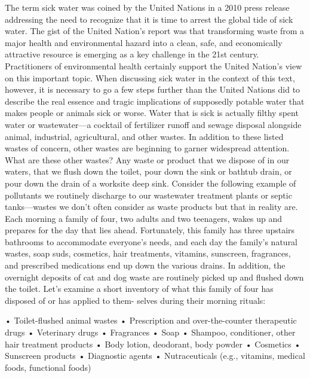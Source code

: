 \documentclass{article}
\begin{document}
The term sick water was coined by the United Nations in a 2010 press
release addressing the need to recognize that it is time to arrest the
global tide of sick water. The gist of the United Nation's report was
that transforming waste from a major health and environmental hazard
into a clean, safe, and economically attractive resource is emerging as
a key challenge in the 21st century. Practitioners of environmental
health certainly support the United Nation's view on this important
topic. When discussing sick water in the context of this text, however,
it is necessary to go a few steps further than the United Nations did to
describe the real essence and tragic implications of supposedly potable
water that makes people or animals sick or worse. Water that is sick is
actually filthy spent water or wastewater---a cocktail of fertilizer
runoff and sewage disposal alongside animal, industrial, agricultural,
and other wastes. In addition to these listed wastes of concern, other
wastes are beginning to garner widespread attention. What are these
other wastes? Any waste or product that we dispose of in our waters,
that we flush down the toilet, pour down the sink or bathtub drain, or
pour down the drain of a worksite deep sink. Consider the following
example of pollutants we routinely discharge to our wastewater treatment
plants or septic tanks---wastes we don't often consider as waste
products but that in reality are. Each morning a family of four, two
adults and two teenagers, wakes up and prepares for the day that lies
ahead. Fortunately, this family has three upstairs bathrooms to
accommodate everyone's needs, and each day the family's natural wastes,
soap suds, cosmetics, hair treatments, vitamins, sunscreen, fragrances,
and prescribed medications end up down the various drains. In addition,
the overnight deposits of cat and dog waste are routinely picked up and
flushed down the toilet. Let's examine a short inventory of what this
family of four has disposed of or has applied to them- selves during
their morning rituals:

• Toilet-flushed animal wastes • Prescription and over-the-counter
therapeutic drugs • Veterinary drugs • Fragrances • Soap • Shampoo,
conditioner, other hair treatment products • Body lotion, deodorant,
body powder • Cosmetics • Sunscreen products • Diagnostic agents •
Nutraceuticals (e.g., vitamins, medical foods, functional foods)
\end{document}
